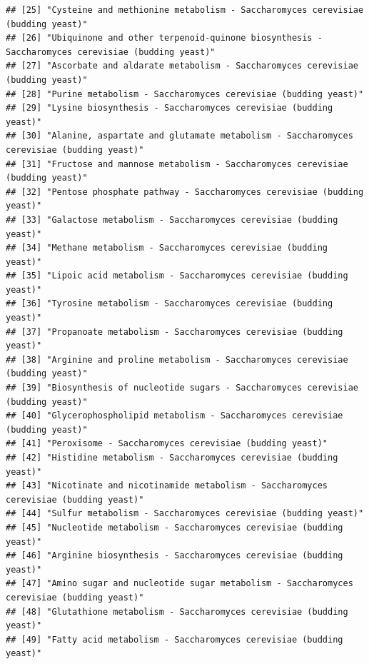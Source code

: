 \documentclass[
]{book}
\begin{document}
\begin{verbatim}
## [25] "Cysteine and methionine metabolism - Saccharomyces cerevisiae (budding yeast)"                    
## [26] "Ubiquinone and other terpenoid-quinone biosynthesis - Saccharomyces cerevisiae (budding yeast)"   
## [27] "Ascorbate and aldarate metabolism - Saccharomyces cerevisiae (budding yeast)"                     
## [28] "Purine metabolism - Saccharomyces cerevisiae (budding yeast)"                                     
## [29] "Lysine biosynthesis - Saccharomyces cerevisiae (budding yeast)"                                   
## [30] "Alanine, aspartate and glutamate metabolism - Saccharomyces cerevisiae (budding yeast)"           
## [31] "Fructose and mannose metabolism - Saccharomyces cerevisiae (budding yeast)"                       
## [32] "Pentose phosphate pathway - Saccharomyces cerevisiae (budding yeast)"                             
## [33] "Galactose metabolism - Saccharomyces cerevisiae (budding yeast)"                                  
## [34] "Methane metabolism - Saccharomyces cerevisiae (budding yeast)"                                    
## [35] "Lipoic acid metabolism - Saccharomyces cerevisiae (budding yeast)"                                
## [36] "Tyrosine metabolism - Saccharomyces cerevisiae (budding yeast)"                                   
## [37] "Propanoate metabolism - Saccharomyces cerevisiae (budding yeast)"                                 
## [38] "Arginine and proline metabolism - Saccharomyces cerevisiae (budding yeast)"                       
## [39] "Biosynthesis of nucleotide sugars - Saccharomyces cerevisiae (budding yeast)"                     
## [40] "Glycerophospholipid metabolism - Saccharomyces cerevisiae (budding yeast)"                        
## [41] "Peroxisome - Saccharomyces cerevisiae (budding yeast)"                                            
## [42] "Histidine metabolism - Saccharomyces cerevisiae (budding yeast)"                                  
## [43] "Nicotinate and nicotinamide metabolism - Saccharomyces cerevisiae (budding yeast)"                
## [44] "Sulfur metabolism - Saccharomyces cerevisiae (budding yeast)"                                     
## [45] "Nucleotide metabolism - Saccharomyces cerevisiae (budding yeast)"                                 
## [46] "Arginine biosynthesis - Saccharomyces cerevisiae (budding yeast)"                                 
## [47] "Amino sugar and nucleotide sugar metabolism - Saccharomyces cerevisiae (budding yeast)"           
## [48] "Glutathione metabolism - Saccharomyces cerevisiae (budding yeast)"                                
## [49] "Fatty acid metabolism - Saccharomyces cerevisiae (budding yeast)"                                 

\end{verbatim}
\end{document}
